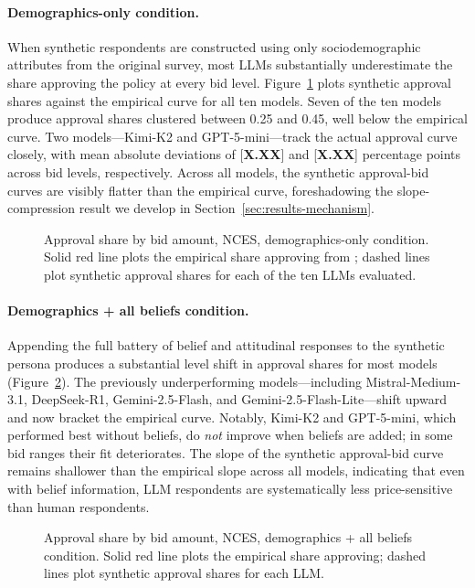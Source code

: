 \documentclass[12pt]{article}
\begin{document}
\paragraph{Demographics-only condition.} When synthetic respondents are constructed using only sociodemographic attributes from the original survey, most LLMs substantially underestimate the share approving the policy at every bid level. Figure~\ref{fig:nces-demo-only} plots synthetic approval shares against the empirical curve for all ten models. Seven of the ten models produce approval shares clustered between 0.25 and 0.45, well below the empirical curve. Two models---Kimi-K2 and GPT-5-mini---track the actual approval curve closely, with mean absolute deviations of [\textbf{X.XX}] and [\textbf{X.XX}] percentage points across bid levels, respectively. Across all models, the synthetic approval-bid curves are visibly flatter than the empirical curve, foreshadowing the slope-compression result we develop in Section~\ref{sec:results-mechanism}.

\begin{figure}[h]
    \centering
    \caption{Approval share by bid amount, NCES, demographics-only condition. Solid red line plots the empirical share approving from \textcite{Aldy2012}; dashed lines plot synthetic approval shares for each of the ten LLMs evaluated.}
    \label{fig:nces-demo-only}
\end{figure}

\paragraph{Demographics + all beliefs condition.} Appending the full battery of belief and attitudinal responses to the synthetic persona produces a substantial level shift in approval shares for most models (Figure~\ref{fig:nces-all-beliefs}). The previously underperforming models---including Mistral-Medium-3.1, DeepSeek-R1, Gemini-2.5-Flash, and Gemini-2.5-Flash-Lite---shift upward and now bracket the empirical curve. Notably, Kimi-K2 and GPT-5-mini, which performed best without beliefs, do \emph{not} improve when beliefs are added; in some bid ranges their fit deteriorates. The slope of the synthetic approval-bid curve remains shallower than the empirical slope across all models, indicating that even with belief information, LLM respondents are systematically less price-sensitive than human respondents.

\begin{figure}[h]
    \centering
    \caption{Approval share by bid amount, NCES, demographics + all beliefs condition. Solid red line plots the empirical share approving; dashed lines plot synthetic approval shares for each LLM.}
    \label{fig:nces-all-beliefs}
\end{figure}
\end{document}
